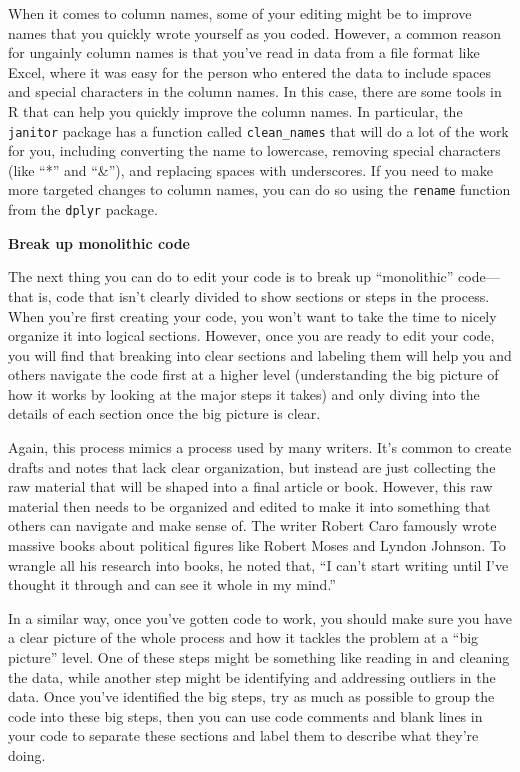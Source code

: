 \documentclass[]{tufte-book}
\begin{document}
When it comes to column names, some of your editing might be to improve names
that you quickly wrote yourself as you coded. However, a common reason for
ungainly column names is that you've read in data from a file format like Excel,
where it was easy for the person who entered the data to include spaces and
special characters in the column names. In this case, there are some tools in
R that can help you quickly improve the column names. In particular, the
\texttt{janitor} package has a function called \texttt{clean\_names} that will do a lot of the
work for you, including converting the name to lowercase, removing special
characters (like ``*'' and ``\&''), and replacing spaces with underscores. If you
need to make more targeted changes to column names, you can do so using the
\texttt{rename} function from the \texttt{dplyr} package.

\textbf{Break up monolithic code}

The next thing you can do to edit your code is to break up ``monolithic''
code---that is, code that isn't clearly divided to show sections or steps in the
process. When you're first creating your code, you won't want to take the time
to nicely organize it into logical sections. However, once you are ready to edit
your code, you will find that breaking into clear sections and labeling them
will help you and others navigate the code first at a higher level
(understanding the big picture of how it works by looking at the major steps it
takes) and only diving into the details of each section once the big picture is
clear.

Again, this process mimics a process used by many writers. It's common to
create drafts and notes that lack clear organization, but instead are just
collecting the raw material that will be shaped into a final article or book.
However, this raw material then needs to be organized and edited to make it
into something that others can navigate and make sense of. The writer Robert
Caro famously wrote massive books about political figures like Robert Moses and
Lyndon Johnson. To wrangle all his research into books, he noted that,
``I can't start writing until I've thought it through and can see it whole
in my mind.''

In a similar way, once you've gotten code to work, you should make sure you have
a clear picture of the whole process and how it tackles the problem at a
``big picture'' level. One of these steps might be something like reading in
and cleaning the data, while another step might be identifying and addressing
outliers in the data. Once you've identified the big steps, try as much as
possible to group the code into these big steps, then you can use code comments
and blank lines in your code to separate these sections and label them to
describe what they're doing.
\end{document}

